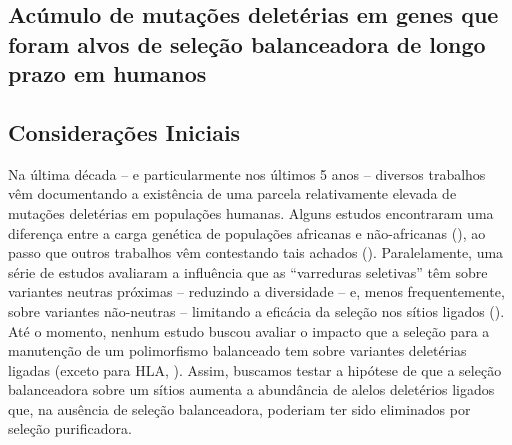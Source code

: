 \begin{refsection}
\chapter{Acúmulo de mutações deletérias em genes que foram alvos de seleção balanceadora de longo prazo em humanos}

\fancyfoot[C]{\thepage}
\setcounter{equation}{0}
\setcounter{figure}{0}
\setcounter{table}{0}
\section{Considerações Iniciais}

Na última década -- e particularmente nos últimos 5 anos -- diversos trabalhos vêm documentando
a existência de uma parcela relativamente elevada de mutações deletérias em populações humanas. Alguns estudos encontraram 
uma diferença entre a carga genética de populações africanas e não-africanas (\cite{Hodgkinson2013,Lohmueller2008,Lohmueller2014,Henn2016}), ao passo que outros trabalhos vêm contestando tais achados (\cite{Do2015,Simons2014}). Paralelamente, uma série de estudos avaliaram a influência que as \enquote{varreduras seletivas} têm sobre variantes neutras próximas -- reduzindo a diversidade -- e, menos frequentemente, sobre variantes não-neutras -- limitando a eficácia da seleção nos sítios ligados (\cite{Betancourt2002,Chun2011}). Até o momento, nenhum estudo buscou avaliar o impacto que a seleção para a manutenção de um polimorfismo balanceado tem sobre variantes deletérias ligadas (exceto para HLA, \cite{Lenz2016}). Assim, buscamos testar a hipótese de que a seleção balanceadora sobre um sítios aumenta a abundância de alelos deletérios ligados que, na ausência de seleção balanceadora, poderiam ter sido eliminados por seleção purificadora. 


\end{refsection}
